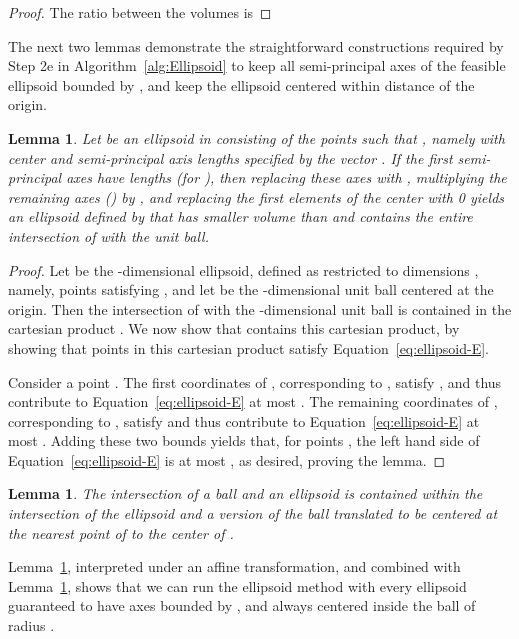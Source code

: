 \documentclass[11pt,letter]{article}
\newcounter{nTheorems}
\numberwithin{nTheorems}{section}
\newtheorem{lemma}[nTheorems]{Lemma}
\begin{document}
\begin{proof}
The ratio between the volumes is

\end{proof}

The next two lemmas demonstrate the straightforward constructions required by Step 2e in Algorithm~\ref{alg:Ellipsoid} to keep all semi-principal axes of the feasible ellipsoid bounded by , and keep the ellipsoid centered within distance  of the origin.

\begin{lemma}\label{lem:resizing}
  Let  be an ellipsoid in  consisting of the points  such that , namely with center  and semi-principal axis lengths specified by the vector . If the first  semi-principal axes have lengths  (for ), then replacing these axes with , multiplying the remaining axes () by , and replacing the first  elements of the center  with 0 yields an ellipsoid  defined by 
  that has smaller volume than  and contains the entire intersection of  with the unit ball.
\end{lemma}
\begin{proof}
  Let  be the -dimensional ellipsoid, defined as  restricted to dimensions , namely, points  satisfying , and let  be the -dimensional unit ball centered at the origin. Then the intersection of  with the -dimensional unit ball is contained in the cartesian product . We now show that  contains this cartesian product, by showing that points in this cartesian product satisfy Equation~\ref{eq:ellipsoid-E}.

  Consider a point . The first  coordinates of , corresponding to , satisfy , and thus contribute to Equation~\ref{eq:ellipsoid-E} at most . The remaining coordinates of , corresponding to , satisfy  and thus contribute to Equation~\ref{eq:ellipsoid-E} at most . Adding these two bounds yields that, for points , the left hand side of Equation~\ref{eq:ellipsoid-E} is at most , as desired, proving the lemma.
\end{proof}

\begin{lemma}\label{lem:recentering}
  The intersection of a ball  and an ellipsoid  is contained within the intersection of the ellipsoid and a version of the ball translated to be centered at the nearest point of  to the center of .
\end{lemma}

Lemma~\ref{lem:recentering}, interpreted under an affine transformation, and combined with Lemma~\ref{lem:resizing}, shows that we can run the ellipsoid method with every ellipsoid guaranteed to have axes bounded by , and always centered inside the ball of radius .
\end{document}
